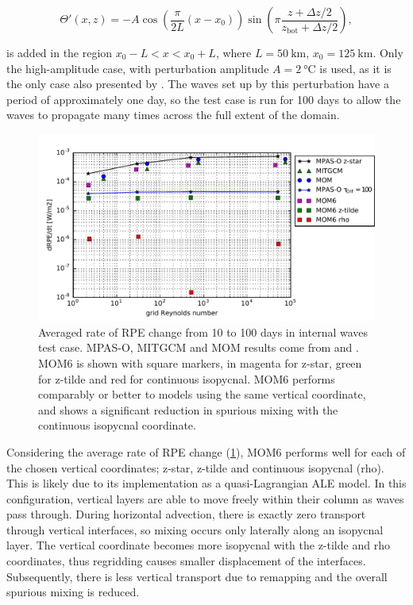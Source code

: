 \begin{equation}
  \Theta'(x,z) = -A\cos\left(\frac{\pi}{2L}(x - x_0)\right) \sin\left(\pi\frac{z + \Delta z/2}{z_\text{bot} + \Delta z/2}\right),
\end{equation}

is added in the region $x_0 - L < x < x_0 + L$, where $L = \SI{50}{\kilo\metre}$, $x_0 = \SI{125}{\kilo\metre}$. Only the high-amplitude case, with perturbation amplitude $A = \SI{2}{\celsius}$ is used, as it is the only case also presented by \citet{petersen15}. The waves set up by this perturbation have a period of approximately one day, so the test case is run for 100 days to allow the waves to propagate many times across the full extent of the domain.


\begin{figure}
  \includegraphics{../plots/internal_waves_drpe.pdf}
  \caption{\label{fig:waves-drpe} Averaged rate of RPE change from 10 to 100 days in internal waves test case. MPAS-O, MITGCM and MOM results come from \citet{petersen15} and \citet{ilicak12}. MOM6 is shown with square markers, in magenta for z-star, green for z-tilde and red for continuous isopycnal. MOM6 performs comparably or better to models using the same vertical coordinate, and shows a significant reduction in spurious mixing with the continuous isopycnal coordinate.}
\end{figure}


Considering the average rate of RPE change (\cref{fig:waves-drpe}), MOM6 performs well for each of the chosen vertical coordinates; z-star, z-tilde and continuous isopycnal (rho). This is likely due to its implementation as a quasi-Lagrangian ALE model. In this configuration, vertical layers are able to move freely within their column as waves pass through. During horizontal advection, there is exactly zero transport through vertical interfaces, so mixing occurs only laterally along an isopycnal layer. The vertical coordinate becomes more isopycnal with the z-tilde and rho coordinates, thus regridding causes smaller displacement of the interfaces. Subsequently, there is less vertical transport due to remapping and the overall spurious mixing is reduced.

